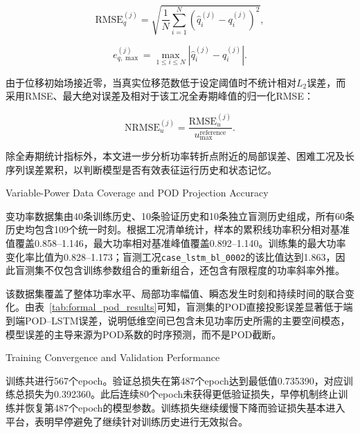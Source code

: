 \begin{equation}
	\mathrm{RMSE}_{q}^{(j)}
	=
	\sqrt{
		\frac{1}{N}
		\sum_{i=1}^{N}
		\left(
		\widehat{q}_i^{(j)}-q_i^{(j)}
		\right)^2
	},
	\label{eq:surrogate_rmse_complete}
\end{equation}

\begin{equation}
	e_{q,\max}^{(j)}
	=
	\max_{1\le i\le N}
	\left|
	\widehat{q}_i^{(j)}-q_i^{(j)}
	\right|.
	\label{eq:surrogate_max_error_complete}
\end{equation}

由于位移初始场接近零，当真实位移范数低于设定阈值时不统计相对$L_2$误差，而采用RMSE、最大绝对误差及相对于该工况全寿期峰值的归一化RMSE：

\begin{equation}
	\mathrm{NRMSE}_{u}^{(j)}
	=
	\frac{\mathrm{RMSE}_{u}^{(j)}}
	{u_{\max}^{\mathrm{reference}}}.
	\label{eq:displacement_nrmse_complete}
\end{equation}

除全寿期统计指标外，本文进一步分析功率转折点附近的局部误差、困难工况及长序列误差累积，以判断模型是否有效表征运行历史和状态记忆。

{Variable-Power Data Coverage and POD Projection Accuracy}

变功率数据集由40条训练历史、10条验证历史和10条独立盲测历史组成，所有60条历史均包含109个统一时刻。根据工况清单统计，样本的累积线功率积分相对基准值覆盖0.858--1.146，最大功率相对基准峰值覆盖0.892--1.140。训练集的最大功率变化率比值为0.828--1.173；盲测工况\texttt{case\_lstm\_bl\_0002}的该比值达到1.863，因此盲测集不仅包含训练参数组合的重新组合，还包含有限程度的功率斜率外推。

该数据集覆盖了整体功率水平、局部功率幅值、瞬态发生时刻和持续时间的联合变化。由表~\ref{tab:formal_pod_results}可知，盲测集的POD直接投影误差显著低于端到端POD--LSTM误差，说明低维空间已包含未见功率历史所需的主要空间模态，模型误差的主导来源为POD系数的时序预测，而不是POD截断。

{Training Convergence and Validation Performance}

训练共进行567个epoch。验证总损失在第487个epoch达到最低值0.735390，对应训练总损失为0.392360。此后连续80个epoch未获得更低验证损失，早停机制终止训练并恢复第487个epoch的模型参数。训练损失继续缓慢下降而验证损失基本进入平台，表明早停避免了继续针对训练历史进行无效拟合。

